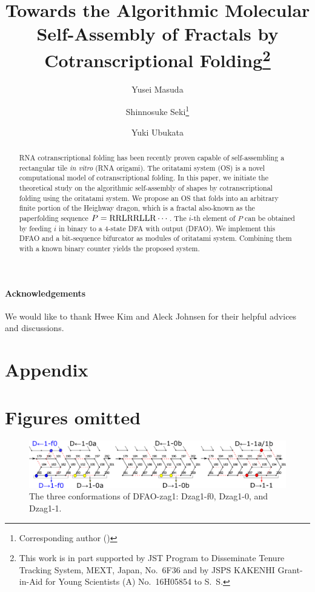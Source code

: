 \documentclass[runningheads]{llncs}
\title{Towards the Algorithmic Molecular Self-Assembly of Fractals by Cotranscriptional Folding\thanks{This work is in part supported by JST Program to Disseminate Tenure Tracking System, MEXT, Japan, No.~6F36 and by JSPS KAKENHI Grant-in-Aid for Young Scientists (A) No.~16H05854 to S.~S.}}
\author{
Yusei Masuda \and 
Shinnosuke Seki\thanks{Corresponding author (\email{s.seki@uec.ac.jp})} \and 
Yuki Ubukata
}
\institute{
Department of Computer and Network Engineering, 
The University of Electro-Communications, 
1-5-1, Chofugaoka, Chofu, Tokyo, 1828585, Japan 
}
\begin{document}
\maketitle

\begin{abstract}
RNA cotranscriptional folding has been recently proven capable of self-assembling a rectangular tile \textit{in vitro} (RNA origami). 
The oritatami system (OS) is a novel computational model of cotranscriptional folding. 
In this paper, we initiate the theoretical study on the algorithmic self-assembly of shapes by cotranscriptional folding using the oritatami system. 
We propose an OS that folds into an arbitrary finite portion of the Heighway dragon, which is a fractal also-known as the paperfolding sequence $P = {\rm RRLRRLLR} \cdots$. 
The $i$-th element of $P$ can be obtained by feeding $i$ in binary to a 4-state DFA with output (DFAO). 
We implement this DFAO and a bit-sequence bifurcator as modules of oritatami system. 
Combining them with a known binary counter yields the proposed system. 
\end{abstract}







	\paragraph{\bf Acknowledgements}
%
We would like to thank Hwee Kim and Aleck Johnsen for their helpful advices and discussions.

	
	

	\newpage
	\appendix
	\section*{Appendix}

\section{Figures omitted}

\begin{figure}[h]
  \includegraphics[width=\linewidth]{pic/DFAO-zag1.png}
  \caption{The three conformations of DFAO-zag1: Dzag1-f0, Dzag1-0, and Dzag1-1.}
  \label{fig:DFAO-zag1}
\end{figure} 
\end{document}
